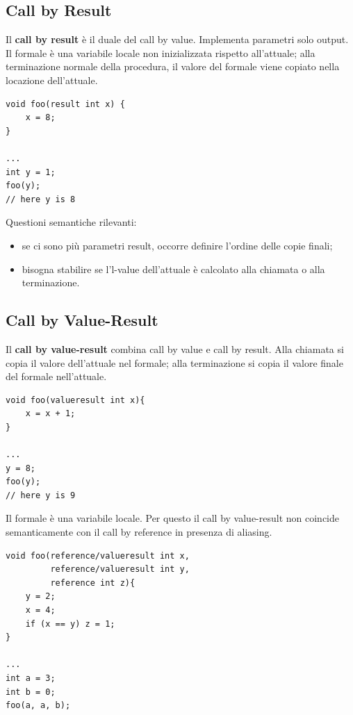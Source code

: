 \documentclass{article}
\begin{document}
\subsection{Call by Result}

Il \textbf{call by result} è il duale del call by value. Implementa parametri solo output. Il formale è una variabile locale non inizializzata rispetto all'attuale; alla terminazione normale della procedura, il valore del formale viene copiato nella locazione dell'attuale.

\begin{lstlisting}
void foo(result int x) {
    x = 8;
}

...
int y = 1;
foo(y);
// here y is 8
\end{lstlisting}

Questioni semantiche rilevanti:
\begin{itemize}
  \item se ci sono più parametri result, occorre definire l'ordine delle copie finali;
  \item bisogna stabilire se l'l-value dell'attuale è calcolato alla chiamata o alla terminazione.
\end{itemize}

\subsection{Call by Value-Result}

Il \textbf{call by value-result} combina call by value e call by result. Alla chiamata si copia il valore dell'attuale nel formale; alla terminazione si copia il valore finale del formale nell'attuale.

\begin{lstlisting}
void foo(valueresult int x){
    x = x + 1;
}

...
y = 8;
foo(y);
// here y is 9
\end{lstlisting}

Il formale è una variabile locale. Per questo il call by value-result non coincide semanticamente con il call by reference in presenza di aliasing.

\begin{lstlisting}
void foo(reference/valueresult int x,
         reference/valueresult int y,
         reference int z){
    y = 2;
    x = 4;
    if (x == y) z = 1;
}

...
int a = 3;
int b = 0;
foo(a, a, b);
\end{lstlisting}
\end{document}

